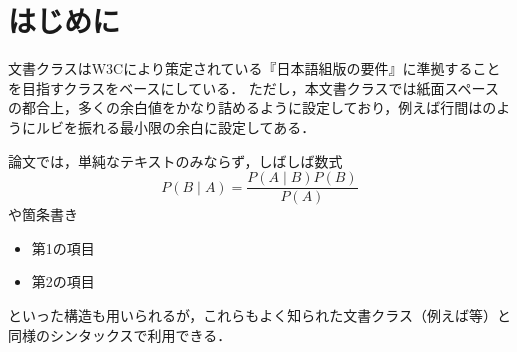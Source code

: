 \section{はじめに}
文書クラスはW3Cにより策定されている『日本語組版の要件』\cite{JLREQ}に準拠することを目指すクラスをベースにしている．
ただし，本文書クラスでは紙面スペースの都合上，多くの余白値をかなり詰めるように設定しており，例えば行間はのようにルビを振れる最小限の余白に設定してある．

論文では，単純なテキストのみならず，しばしば数式
\begin{equation}
P(B\mid A) = \frac{P(A\mid B)P(B)}{P(A)}
\end{equation}
や箇条書き
\begin{itemize}
\item 第1の項目
\item 第2の項目
\end{itemize}
といった構造も用いられるが，これらもよく知られた文書クラス（例えば等）と同様のシンタックスで利用できる．